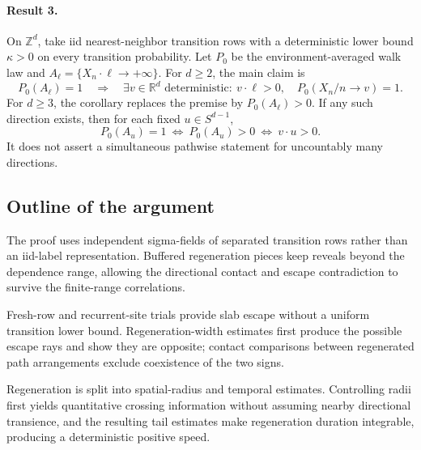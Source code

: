 \documentclass[11pt]{article}
\begin{document}
\paragraph{Result 3.} On \(\mathbb Z^d\), take iid nearest-neighbor transition rows with a deterministic lower bound \(\kappa>0\) on every transition probability. Let \(P_0\) be the environment-averaged walk law and \(A_\ell=\{X_n\cdot\ell\to+\infty\}\). For \(d\ge2\), the main claim is
\[
 P_0(A_\ell)=1\quad\Longrightarrow\quad
 \exists v\in\mathbb R^d\text{ deterministic}:\
 v\cdot\ell>0,\quad P_0(X_n/n\to v)=1.
\]
For \(d\ge3\), the corollary replaces the premise by \(P_0(A_\ell)>0\). If any such direction exists, then for each fixed \(u\in S^{d-1}\),
\[
 P_0(A_u)=1\ \Longleftrightarrow\ P_0(A_u)>0\ \Longleftrightarrow\ v\cdot u>0.
\]
It does not assert a simultaneous pathwise statement for uncountably many directions.

\subsection{Outline of the argument}
The proof uses independent sigma-fields of separated transition rows rather than an iid-label representation. Buffered regeneration pieces keep reveals beyond the dependence range, allowing the directional contact and escape contradiction to survive the finite-range correlations.

Fresh-row and recurrent-site trials provide slab escape without a uniform transition lower bound. Regeneration-width estimates first produce the possible escape rays and show they are opposite; contact comparisons between regenerated path arrangements exclude coexistence of the two signs.

Regeneration is split into spatial-radius and temporal estimates. Controlling radii first yields quantitative crossing information without assuming nearby directional transience, and the resulting tail estimates make regeneration duration integrable, producing a deterministic positive speed.
\end{document}
